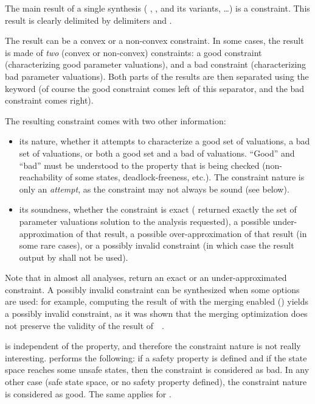 The main result of a single synthesis (\ie{} \EFsynth{}, \PDFC{}, \IM{} and its variants, \PRP{}…) is a constraint.
This result is clearly delimited by delimiters  and .

The result can be a convex or a non-convex constraint.
In some cases, the result is made of \emph{two} (convex or non-convex) constraints: a good constraint (characterizing good parameter valuations), and a bad constraint (characterizing bad parameter valuations).
Both parts of the results are then separated using the keyword  (of course the good constraint comes left of this separator, and the bad constraint comes right).

The resulting constraint comes with two other information:
\begin{itemize}
	\item its nature, \ie{} whether it attempts to characterize a good set of valuations, a bad set of valuations, or both a good set and a bad of valuations.
		``Good'' and ``bad'' must be understood to the property that is being checked (non-reachability of some states, deadlock-freeness, etc.).
		The constraint nature is only an \emph{attempt}, as the constraint may not always be sound (see below).
	\item its soundness, \ie{} whether the constraint is exact (\imitator{} returned exactly the set of parameter valuations solution to the analysis requested), a possible under-approximation of that result, a possible over-approximation of that result (in some rare cases), or a possibly invalid constraint (in which case the result output by \imitator{} shall not be used).
\end{itemize}
Note that in almost all analyses, \imitator{} return an exact or an under-approximated constraint.
A possibly invalid constraint can be synthesized when some options are used: for example, computing the result of \IM{} with the merging enabled () yields a possibly invalid constraint, as it was shown that the merging optimization does not preserve the validity of the result of~\IM{}~\cite{AFS13atva}.

\begin{remark}
	\IM{} is independent of the property, and therefore the constraint nature is not really interesting.
	\imitator{} performs the following:
	if a safety property is defined and if the state space reaches some unsafe states, then the constraint is considered as bad.
	In any other case (safe state space, or no safety property defined), the constraint nature is considered as good.
	The same applies for \BC{}.
\end{remark}


